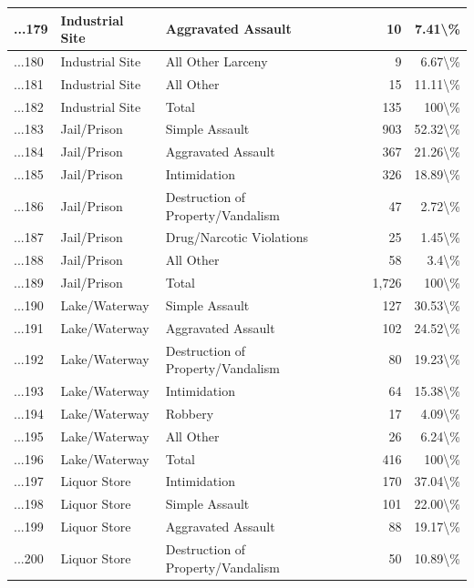 \documentclass[
]{krantz}
\begin{document}
\begin{longtable}[t]{l|l|l|r|r}
\hline
...179 & Industrial Site & Aggravated Assault & 10 & 7.41\textbackslash{}\%\\
\hline
...180 & Industrial Site & All Other Larceny & 9 & 6.67\textbackslash{}\%\\
\hline
...181 & Industrial Site & All Other & 15 & 11.11\textbackslash{}\%\\
\hline
...182 & Industrial Site & Total & 135 & 100\textbackslash{}\%\\
\hline
...183 & Jail/Prison & Simple Assault & 903 & 52.32\textbackslash{}\%\\
\hline
...184 & Jail/Prison & Aggravated Assault & 367 & 21.26\textbackslash{}\%\\
\hline
...185 & Jail/Prison & Intimidation & 326 & 18.89\textbackslash{}\%\\
\hline
...186 & Jail/Prison & Destruction of Property/Vandalism & 47 & 2.72\textbackslash{}\%\\
\hline
...187 & Jail/Prison & Drug/Narcotic Violations & 25 & 1.45\textbackslash{}\%\\
\hline
...188 & Jail/Prison & All Other & 58 & 3.4\textbackslash{}\%\\
\hline
...189 & Jail/Prison & Total & 1,726 & 100\textbackslash{}\%\\
\hline
...190 & Lake/Waterway & Simple Assault & 127 & 30.53\textbackslash{}\%\\
\hline
...191 & Lake/Waterway & Aggravated Assault & 102 & 24.52\textbackslash{}\%\\
\hline
...192 & Lake/Waterway & Destruction of Property/Vandalism & 80 & 19.23\textbackslash{}\%\\
\hline
...193 & Lake/Waterway & Intimidation & 64 & 15.38\textbackslash{}\%\\
\hline
...194 & Lake/Waterway & Robbery & 17 & 4.09\textbackslash{}\%\\
\hline
...195 & Lake/Waterway & All Other & 26 & 6.24\textbackslash{}\%\\
\hline
...196 & Lake/Waterway & Total & 416 & 100\textbackslash{}\%\\
\hline
...197 & Liquor Store & Intimidation & 170 & 37.04\textbackslash{}\%\\
\hline
...198 & Liquor Store & Simple Assault & 101 & 22.00\textbackslash{}\%\\
\hline
...199 & Liquor Store & Aggravated Assault & 88 & 19.17\textbackslash{}\%\\
\hline
...200 & Liquor Store & Destruction of Property/Vandalism & 50 & 10.89\textbackslash{}\%\\

\end{longtable}
\end{document}
